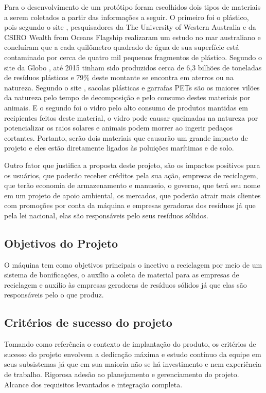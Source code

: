 \begin{apendicesenv}
Para o desenvolvimento de um protótipo foram escolhidos dois tipos de materiais a serem coletados a partir das informações a seguir. O primeiro foi o plástico, pois segundo o site \cite{ecycle}, pesquisadores da The University of  Western Australia e da CSIRO Wealth from Oceans Flagship realizaram um estudo no mar australiano e concluíram que a cada quilômetro quadrado de água de sua superfície está contaminado por cerca de quatro mil pequenos fragmentos de plástico. Segundo o site da Globo \cite{oglobo}, até 2015 tinham sido produzidos cerca de 6,3 bilhões de toneladas de resíduos plásticos e 79\% deste montante se encontra em aterros ou na natureza. Segundo o site \cite{culturamix}, sacolas plásticas e garrafas PETs são os maiores vilões da natureza pelo tempo de decomposição e pelo consumo destes materiais por animais. E o segundo foi o vidro pelo alto consumo de produtos mantidas em recipientes feitos deste material, o vidro pode causar queimadas na natureza por potencializar os raios solares e animais podem morrer ao ingerir pedaços cortantes. Portanto, serão dois materiais que causarão um grande impacto de projeto e eles estão diretamente ligados às poluições marítimas e de solo.

Outro fator que justifica a proposta deste projeto, são os impactos positivos para os usuários, que poderão receber créditos pela sua ação, empresas de reciclagem, que terão economia de armazenamento e manuseio, o governo, que terá seu nome em um projeto de apoio ambiental, os mercados, que poderão atrair mais clientes com promoções por conta da máquina e empresas geradoras dos resíduos já que pela lei nacional, elas são responsáveis pelo seus resíduos sólidos.

\subsection{Objetivos do Projeto}

O máquina tem como objetivos principais o incetivo a reciclagem por meio de um sistema de bonificações, o auxílio a coleta de material para as empresas de reciclagem e auxílio às empresas geradoras de resíduos sólidos já que elas são responsáveis pelo o que produz.

\subsection{Critérios de sucesso do projeto}

Tomando como referência o contexto de implantação do produto, os critérios de sucesso do projeto envolvem a dedicação máxima e estudo contínuo da equipe em seus subsistemas já que em sua maioria não se há investimento e nem experiência de trabalho. Rigorosa adesão ao planejamento e gerenciamento do projeto. Alcance dos requisitos levantados e integração completa.


\end{apendicesenv}
